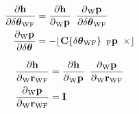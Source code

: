 \begin{align}
  \dfrac{\partial{\projFunc}}
				{\partial{\dtheta_{\world\fiducial}}}
		&=
			\dfrac{\partial{\projFunc}}
						{\partial{\Pt{\world}}}
			\enspace
			\dfrac{\partial{\Pt{\world}}}
						{\partial{\dtheta_{\world\fiducial}}} \\
  \dfrac{\partial{\Pt{\world}}}{\partial{\dtheta}}
    &= -\Skew{\rot\{\dtheta_{\world\fiducial}\} \enspace \Pt{\fiducial}}
\end{align}

\begin{align}
  \dfrac{\partial{\projFunc}}{\partial{\Pos{\world}{\fiducial}}}
		&=
			\dfrac{\partial{\projFunc}}{\partial{\Pt{\world}}}
			\enspace
			\dfrac{\partial{\Pt{\world}}}{\partial{\Pos{\world}{\fiducial}}} \\
  \dfrac{\partial{\Pt{\world}}}{\partial{\Pos{\world}{\fiducial}}} &= \I
\end{align}
